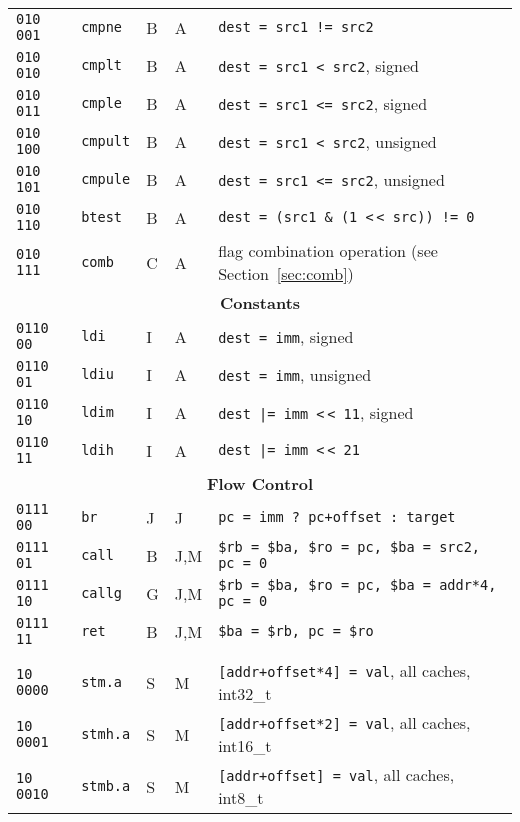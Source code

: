 \documentclass[10pt,a4paper]{article}
\newcommand{\shl}{\textless$\,\!$\textless}
\begin{document}
\begin{longtable}{llllp{}}
\texttt{010 001} & \texttt{cmpne} & B & A & \texttt{dest = src1 != src2} \\
\texttt{010 010} & \texttt{cmplt} & B & A & \texttt{dest = src1 \textless{} src2}, signed \\
\texttt{010 011} & \texttt{cmple} & B & A & \texttt{dest = src1 \textless{}= src2}, signed \\
\texttt{010 100} & \texttt{cmpult} & B & A & \texttt{dest = src1 \textless{} src2}, unsigned \\
\texttt{010 101} & \texttt{cmpule} & B & A & \texttt{dest = src1 \textless{}= src2}, unsigned \\
\texttt{010 110} & \texttt{btest} & B & A & \texttt{dest = (src1 \& (1 \shl{} src)) != 0} \\
\texttt{010 111} & \texttt{comb} & C & A & flag combination operation (see Section~\ref{sec:comb}) \\
\midrule
\multicolumn{5}{c}{\textbf{Constants}} \\
\cmidrule{1-5}
\texttt{0110 00} & \texttt{ldi} & I & A & \texttt{dest = imm}, signed \\
\texttt{0110 01} & \texttt{ldiu} & I & A & \texttt{dest = imm}, unsigned \\
\texttt{0110 10} & \texttt{ldim} & I & A & \texttt{dest |= imm \shl{} 11}, signed \\
\texttt{0110 11} & \texttt{ldih} & I & A & \texttt{dest |= imm \shl{} 21} \\
\midrule
\multicolumn{5}{c}{\textbf{Flow Control}} \\
\cmidrule{1-5}
\texttt{0111 00} & \texttt{br} & J & J & \texttt{pc = imm ?\ pc+offset :\ target} \\
\texttt{0111 01} & \texttt{call} & B & J,M & \texttt{\$rb = \$ba, \$ro = pc, \$ba = src2, pc = 0} \\
\texttt{0111 10} & \texttt{callg} & G & J,M & \texttt{\$rb = \$ba, \$ro = pc, \$ba = addr*4, pc = 0} \\
\texttt{0111 11} & \texttt{ret} & B & J,M & \texttt{\$ba = \$rb, pc = \$ro} \\
\midrule
\pagebreak
\midrule
\multicolumn{5}{c}{\textbf{Memory Accesses}} \\
\cmidrule{1-5}
\texttt{10 0000} & \texttt{stm.a} & S & M & \texttt{[addr+offset*4] = val}, all caches, int32\_t \\
\texttt{10 0001} & \texttt{stmh.a} & S & M & \texttt{[addr+offset*2] = val}, all caches, int16\_t \\
\texttt{10 0010} & \texttt{stmb.a} & S & M & \texttt{[addr+offset] = val}, all caches, int8\_t \\

\end{longtable}
\end{document}
